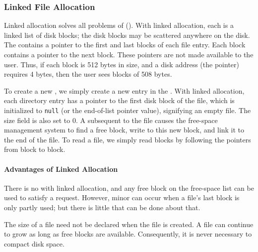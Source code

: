 \subsubsection{Linked File Allocation}\label{subsubsec:Linked_File_Allocation}
Linked allocation solves all problems of  ().
With linked allocation, each  is a linked list of disk blocks; the disk blocks may be scattered anywhere on the disk.
The  contains a pointer to the first and last blocks of each file entry.
Each block contains a pointer to the next block.
These pointers are not made available to the user.
Thus, if each block is 512 bytes in size, and a disk address (the pointer) requires 4 bytes, then the user sees blocks of 508 bytes.

To create a new , we simply create a new entry in the .
With linked allocation, each directory entry has a pointer to the first disk block of the file, which is initialized to \texttt{null} (or the end-of-list pointer value), signifying an empty file.
The size field is also set to 0.
A subsequent  to the file causes the free-space management system to find a free block, write to this new block, and link it to the end of the file.
To read a file, we simply read blocks by following the pointers from block to block.

\paragraph{Advantages of Linked Allocation}\label{par:Linked_File_Allocation_Advantages}
There is no  with linked allocation, and any free block on the free-space list can be used to satisfy a request.
However, minor  can occur when a file's last block is only partly used; but there is little that can be done about that.

The size of a file need not be declared when the file is created.
A file can continue to grow as long as free blocks are available.
Consequently, it is never necessary to compact disk space.


